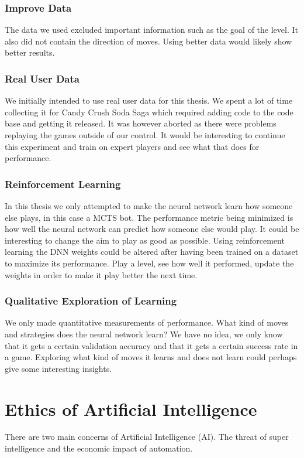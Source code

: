 \documentclass{kththesis}
\begin{document}
\subsubsection{Improve Data}
The data we used excluded important information such as the goal of the level. It also did not contain the direction of moves. Using better data would likely show better results.

\subsubsection{Real User Data}
We initially intended to use real user data for this thesis. We spent a lot of time collecting  it for Candy Crush Soda Saga which required adding code to the code base and getting it released.  It was however aborted as there were problems replaying the games outside of our control. It would be interesting to continue this experiment and train on expert players and see what that does for performance.

\subsubsection{Reinforcement Learning}
In this thesis we only attempted to make the neural network learn how someone else plays, in this case a MCTS bot. The performance metric being minimized is how well the neural network can predict how someone else would play. It could be interesting to change the aim to play as good as possible. Using reinforcement learning the DNN weights could be altered after having been trained on a dataset to maximize its performance. Play a level, see how well it performed, update the weights in order to make it play better the next time. 

\subsubsection{Qualitative Exploration of Learning}
We only made quantitative measurements of performance. What kind of moves and strategies does the neural network learn? We have no idea, we only know that it gets a certain validation accuracy and that it gets a certain success rate in a game. Exploring what kind of moves  it learns and does not learn could perhaps give some interesting insights.

\section{Ethics of Artificial Intelligence}
There are two main concerns of Artificial Intelligence (AI). The threat of super intelligence and the economic impact of automation.
\end{document}
